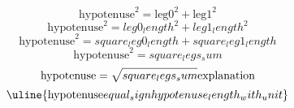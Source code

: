 \[\text{{{hypotenuse}}}^{{2}}=\text{{{leg0}}}^{{2}}+\text{{{leg1}}}^{{2}}\]
\[\text{{{hypotenuse}}}^{{2}}={leg0_length}^{{2}}+{leg1_length}^{{2}}\]
\[\text{{{hypotenuse}}}^{{2}}={square_leg0_length}+{square_leg1_length}\]
\[\text{{{hypotenuse}}}^{{2}}={square_legs_sum}\]
\[\text{{{hypotenuse}}}=\sqrt{{\mathstrut {square_legs_sum}}}\text{{{explanation}}}\]
\[\uline{{\text{{{hypotenuse}}}{equal_sign}{hypotenuse_length_with_unit}}}\]